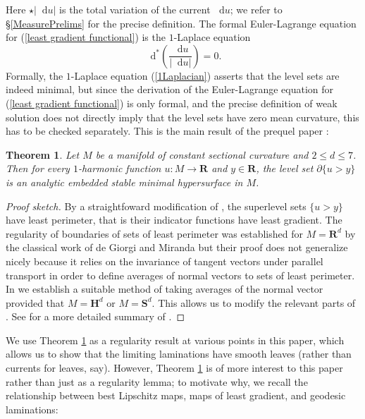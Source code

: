 \documentclass[reqno,11pt]{amsart}
\newcommand{\RR}{\mathbf{R}}
\newcommand{\Hyp}{\mathbf H}
\newcommand{\Sph}{\mathbf S}
\newcommand*\dif{\mathop{}\!\mathrm{d}}
\newtheorem{theorem}{Theorem}[section]
\theoremstyle{definition}
\numberwithin{equation}{section}
\begin{document}
Here $\star |\dif u|$ is the total variation of the current $\dif u$; we refer to \S\ref{MeasurePrelims} for the precise definition.
The formal Euler-Lagrange equation for (\ref{least gradient functional}) is the $1$-Laplace equation
\begin{equation}\label{1Laplacian}
\dif^* \left(\frac{\dif u}{|\dif u|}\right) = 0.
\end{equation}
Formally, the $1$-Laplace equation (\ref{1Laplacian}) asserts that the level sets are indeed minimal, but since the derivation of the Euler-Lagrange equation for (\ref{least gradient functional}) is only formal, and the precise definition of weak solution \cite{Mazon14} does not directly imply that the level sets have zero mean curvature, this has to be checked separately.
This is the main result of the prequel paper \cite{BackusFLG}:

\begin{theorem}\label{main thm of old paper}
Let $M$ be a manifold of constant sectional curvature and $2 \leq d \leq 7$.
Then for every $1$-harmonic function $u: M \to \RR$ and $y \in \RR$, the level set $\partial \{u > y\}$ is an analytic embedded stable minimal hypersurface in $M$.
\end{theorem}
\begin{proof}[Proof sketch]
By a straightfoward modification of \cite[Theorem 1]{BOMBIERI1969}, the superlevel sets $\{u > y\}$ have least perimeter, that is their indicator functions have least gradient.
The regularity of boundaries of sets of least perimeter was established for $M = \RR^d$ by the classical work of de Giorgi and Miranda \cite{deGiorgi61, Miranda66} but their proof does not generalize nicely because it relies on the invariance of tangent vectors under parallel transport in order to define averages of normal vectors to sets of least perimeter.
In \cite[\S3]{BackusFLG} we establish a suitable method of taking averages of the normal vector provided that $M = \Hyp^d$ or $M = \Sph^d$.
This allows us to modify the relevant parts of \cite{Miranda66}.
See \cite[\S1]{BackusFLG} for a more detailed summary of \cite{BackusFLG}.
\end{proof}

We use Theorem \ref{main thm of old paper} as a regularity result at various points in this paper, which allows us to show that the limiting laminations have smooth leaves (rather than currents for leaves, say).
However, Theorem \ref{main thm of old paper} is of more interest to this paper rather than just as a regularity lemma; to motivate why, we recall the  relationship between best Lipschitz maps, maps of least gradient, and geodesic laminations:
\end{document}
